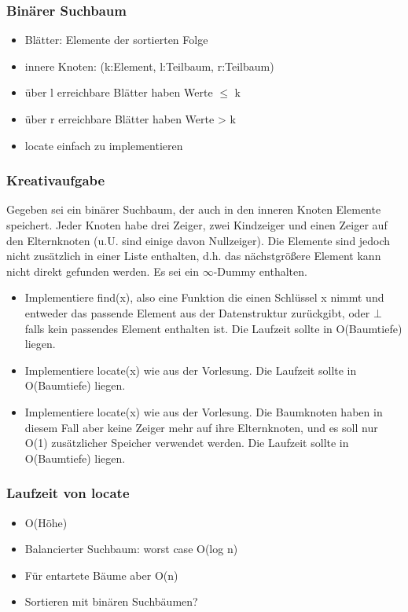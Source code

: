 \begin{frame}
\frametitle{Binärer Suchbaum}
\begin{itemize}
\item Blätter: Elemente der sortierten Folge
\item innere Knoten: (k:Element, l:Teilbaum, r:Teilbaum)\pause
\item über l erreichbare Blätter haben Werte $\leq$ k
\item über r erreichbare Blätter haben Werte > k\pause
\item locate einfach zu implementieren
\end{itemize}
\end{frame}

\begin{frame}
\frametitle{Kreativaufgabe}
Gegeben sei ein binärer Suchbaum, der auch in den inneren Knoten Elemente speichert. Jeder
Knoten habe drei Zeiger, zwei Kindzeiger und einen Zeiger auf den Elternknoten (u.U. sind einige
davon Nullzeiger). Die Elemente sind jedoch nicht zusätzlich in einer Liste enthalten, d.h. das
nächstgrößere Element kann nicht direkt gefunden werden. Es sei ein $\infty$-Dummy enthalten.
\begin{itemize}
\item Implementiere find(x), also eine Funktion die einen Schlüssel x
nimmt und entweder das passende Element aus der Datenstruktur zurückgibt, oder $\bot$ falls
kein passendes Element enthalten ist. Die Laufzeit sollte in O(Baumtiefe) liegen.
\item Implementiere locate(x) wie aus der Vorlesung. Die Laufzeit sollte
in O(Baumtiefe) liegen.
\item Implementiere locate(x) wie aus der Vorlesung. Die Baumknoten
haben in diesem Fall aber keine Zeiger mehr auf ihre Elternknoten, und es soll nur O(1)
zusätzlicher Speicher verwendet werden. Die Laufzeit sollte in O(Baumtiefe) liegen.
\end{itemize}
\end{frame}

\begin{frame}
\frametitle{Laufzeit von locate}
\begin{itemize}
\item O(Höhe)\pause
\item Balancierter Suchbaum: worst case O(log n)
\item Für entartete Bäume aber O(n)\pause
\item Sortieren mit binären Suchbäumen?
\end{itemize}
\end{frame}

